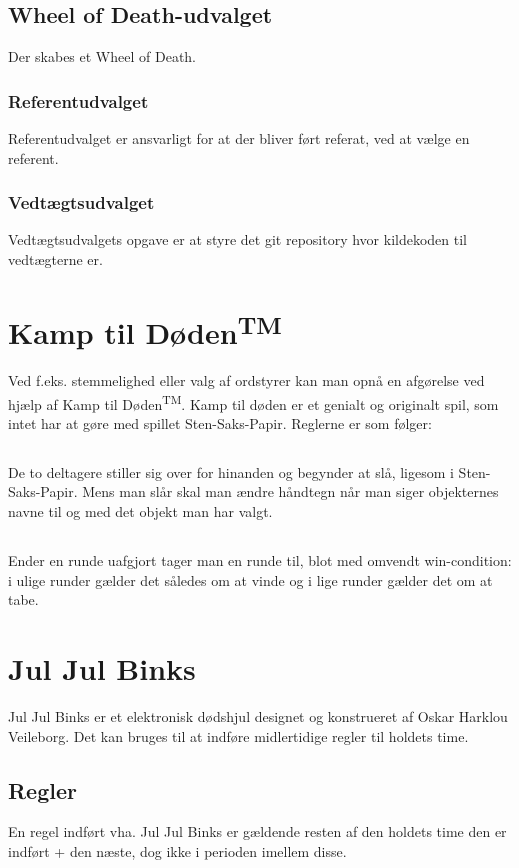 \documentclass{article}
\begin{document}
	\subsection{Wheel of Death-udvalget}
	Der skabes et Wheel of Death.
	\subsubsection{Referentudvalget}
	Referentudvalget er ansvarligt for at der bliver ført referat, ved at vælge en referent.
	\subsubsection{Vedtægtsudvalget}
	Vedtægtsudvalgets opgave er at styre det git repository hvor kildekoden til vedtægterne er.
	
	
	\section{Kamp til Døden\textsuperscript{TM}}
	Ved f.eks. stemmelighed eller valg af ordstyrer kan man opnå en afgørelse ved hjælp af Kamp til Døden\textsuperscript{TM}. Kamp til døden er et genialt og originalt spil, som intet har at gøre med spillet Sten-Saks-Papir. Reglerne er som følger:
	\subsection{}
	De to deltagere stiller sig over for hinanden og begynder at slå, ligesom i Sten-Saks-Papir. Mens man slår skal man ændre håndtegn når man siger objekternes navne til og med det objekt man har valgt.
	\subsection{}
	Ender en runde uafgjort tager man en runde til, blot med omvendt win-condition: i ulige runder gælder det således om at vinde og i lige runder gælder det om at tabe.
	
	\section{Jul Jul Binks}
	Jul Jul Binks er et elektronisk dødshjul designet og konstrueret af Oskar Harklou Veileborg. Det kan bruges til at indføre midlertidige regler til holdets time.
	\subsection{Regler}
	En regel indført vha. Jul Jul Binks er gældende resten af den holdets time den er indført + den næste, dog ikke i perioden imellem disse.
\end{document}

